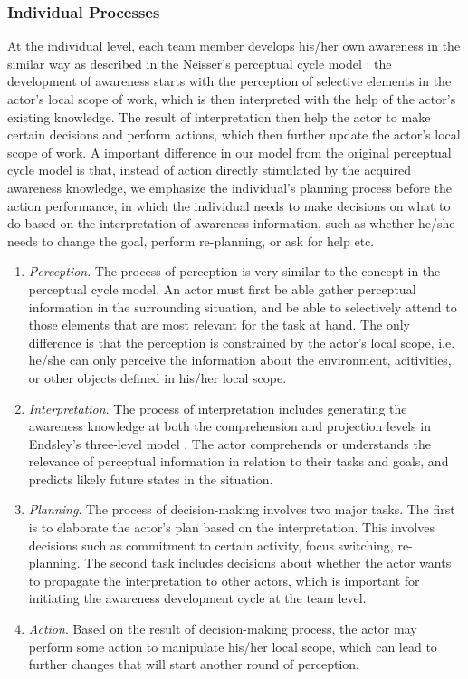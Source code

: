 \subsubsection{Individual Processes} %
\label{ssub:cognitive_processes}
At the individual level, each team member develops his/her own awareness in the similar way as described in the Neisser's perceptual cycle model \cite{neisser1976cognition}: the development of awareness starts with the perception of selective elements in the actor's local scope of work, which is then interpreted with the help of the actor's existing knowledge. The result of interpretation then help the actor to make certain decisions and perform actions, which then further update the actor's local scope of work. A important difference in our model from the original perceptual cycle model is that, instead of action directly stimulated by the acquired awareness knowledge, we emphasize the individual's planning process before the action performance, in which the individual needs to make decisions on what to do based on the interpretation of awareness information, such as whether he/she needs to change the goal, perform re-planning, or ask for help etc.

\begin{enumerate}
	\item \emph{Perception}. The process of perception is very similar to the concept in the perceptual cycle model. An actor must first be able gather perceptual information in the surrounding situation, and be able to selectively attend to those elements that are most relevant for the task at hand. The only difference is that the perception is constrained by the actor's local scope, i.e. he/she can only perceive the information about the environment, acitivities, or other objects defined in his/her local scope.
	\item \emph{Interpretation}. The process of interpretation includes generating the awareness knowledge at both the comprehension and projection levels in Endsley's three-level model \cite{Endsley1995}. The actor comprehends or understands the relevance of perceptual information in relation to their tasks and goals, and predicts likely future states in the situation.
	\item \emph{Planning}. The process of decision-making involves two major tasks. The first is to elaborate the actor's plan based on the interpretation. This involves decisions such as commitment to certain activity, focus switching, re-planning. The second task includes decisions about whether the actor wants to propagate the interpretation to other actors, which is important for initiating the awareness development cycle at the team level.
	\item \emph{Action}. Based on the result of decision-making process, the actor may perform some action to manipulate his/her local scope, which can lead to further changes that will start another round of perception.
\end{enumerate}

